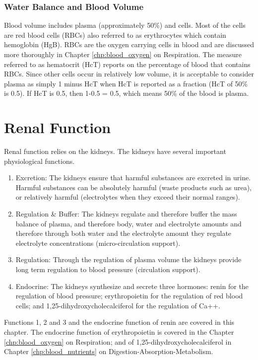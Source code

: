 \subsubsection{Water Balance and Blood Volume}

Blood volume includes plasma (approximately 50\%) and cells. Most of the cells are red blood cells (RBCs) also referred to as erythrocytes which contain hemoglobin (HgB). RBCs are the oxygen carrying cells in blood and are discussed more thoroughly in Chapter \ref{chp:blood_oxygen} on Respiration. The measure referred to as hematocrit (HcT) reports on the percentage of blood that contains RBCs. Since other cells occur in relatively low volume, it is acceptable to consider plasma as simply 1 minus HcT when HcT is reported as a fraction (HcT of 50\% is 0.5). If HcT is 0.5, then 1-0.5 = 0.5, which means 50\% of the blood is plasma.

\section{Renal Function}

Renal function relies on the kidneys. The kidneys have several important physiological functions. 

\begin{enumerate}
    \item Excretion: The kidneys ensure that harmful substances are excreted in urine. Harmful substances can be absolutely harmful (waste products such as urea), or relatively harmful (electrolytes when they exceed their normal ranges).
    \item Regulation \& Buffer: The kidneys regulate and therefore buffer the mass balance of plasma, and therefore body, water and electrolyte amounts and therefore through both water and the electrolyte amount they regulate electrolyte concentrations (micro-circulation support).
    \item Regulation: Through the regulation of plasma volume the kidneys provide long term regulation to blood pressure (circulation support).
    \item Endocrine: The kidneys synthesize and secrete three hormones: renin for the regulation of blood pressure; erythropoietin for the regulation of red blood cells; and 1,25-dihydroxycholecalciferol for the regulation of Ca++.
\end{enumerate}

Functions 1, 2 and 3 and the endocrine function of renin are covered in this chapter. The endocrine function of erythropoietin is covered in the Chapter \ref{chp:blood_oxygen} on Respiration; and of 1,25-dihydroxycholecalciferol in Chapter \ref{chp:blood_nutrients} on Digestion-Absorption-Metabolism.

